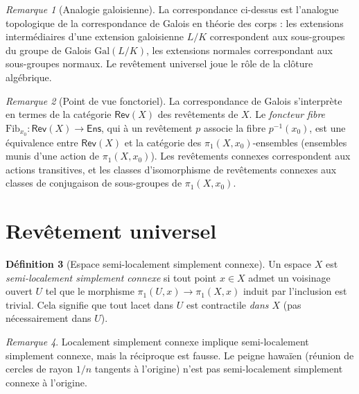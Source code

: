 \documentclass[12pt,a4paper,openany]{book}
\theoremstyle{definition}
\newtheorem{definition}{Définition}[chapter]
\theoremstyle{plain}
\theoremstyle{remark}
\newtheorem{remarque}[definition]{Remarque}
\begin{document}
\begin{remarque}[Analogie galoisienne]\label{rem:analogie-galoisienne}
La correspondance ci-dessus est l'analogue topologique de la correspondance de Galois en théorie
des corps : les extensions intermédiaires d'une extension galoisienne $L/K$ correspondent aux
sous-groupes du groupe de Galois $\mathrm{Gal}(L/K)$, les extensions normales correspondant aux
sous-groupes normaux. Le revêtement universel joue le rôle de la clôture algébrique.
\end{remarque}

\begin{remarque}[Point de vue fonctoriel]\label{rem:foncteur-fibre}
La correspondance de Galois s'interprète en termes de la catégorie
$\mathsf{Rev}(X)$ des revêtements de $X$. Le \emph{foncteur fibre}
$\mathrm{Fib}_{x_0} \colon \mathsf{Rev}(X) \to \mathsf{Ens}$, qui à un revêtement $p$
associe la fibre $p^{-1}(x_0)$, est une équivalence entre $\mathsf{Rev}(X)$ et la catégorie
des $\pi_1(X, x_0)$-ensembles (ensembles munis d'une action de $\pi_1(X, x_0)$).
Les revêtements connexes correspondent aux actions transitives, et les classes
d'isomorphisme de revêtements connexes aux classes de conjugaison de sous-groupes de $\pi_1(X, x_0)$.
\end{remarque}

\section{Revêtement universel}\label{sec:rev-universel}

\begin{definition}[Espace semi-localement simplement connexe]\label{def:semi-loc-simp-connexe}
Un espace $X$ est \emph{semi-localement simplement connexe} si tout point $x \in X$ admet
un voisinage ouvert $U$ tel que le morphisme $\pi_1(U, x) \to \pi_1(X, x)$ induit par
l'inclusion est trivial. Cela signifie que tout lacet dans $U$ est contractile \emph{dans $X$}
(pas nécessairement dans $U$).
\end{definition}

\begin{remarque}\label{rem:localement-vs-semi}
Localement simplement connexe implique semi-localement simplement connexe, mais la réciproque est fausse.
Le peigne hawaïen (réunion de cercles de rayon $1/n$ tangents à l'origine) n'est pas semi-localement
simplement connexe à l'origine.
\end{remarque}
\end{document}
